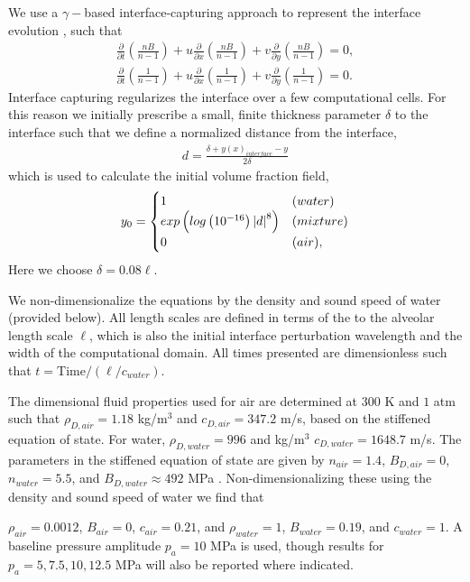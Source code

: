 \documentclass{jfm}%
\newcommand{\abs}[1]{\ensuremath{\left|#1\right|}}
\begin{document}
We use a $\gamma-$based interface-capturing approach to represent the
interface evolution \citep{Shyue1998}, such that
\begin{subequations} \label{usbe_lung_eosvar_advection}%
  \begin{align}%
    \frac{\partial}{\partial t}\left(\frac{n B}{n-1}\right)+u\frac{\partial}{\partial x}\left(\frac{n B}{n-1}\right)+v\frac{\partial}{\partial y}\left(\frac{n B}{n-1}\right) = 0,\\
    \frac{\partial}{\partial t}\left(\frac{1}{n-1}\right)+u\frac{\partial}{\partial x}\left(\frac{1}{n-1}\right)+v\frac{\partial}{\partial y}\left(\frac{1}{n-1}\right) = 0. 
  \end{align}%
\end{subequations}%
Interface capturing regularizes the interface over a few computational
cells. For this reason we initially prescribe a small, finite
thickness parameter $\delta$ to the interface \citep{Latini2007} such
that we define a normalized distance from the interface,
\begin{align*}
  d = \frac{\delta +y(x)_{interface} -y}{2\delta}
\end{align*}
which is used to calculate the initial volume fraction field,
\begin{align*}
  y_0 = %
  \begin{cases}
    1& \text(water)\\%
    exp\left(log\left(10^{-16}\right)\abs{d}^8\right)&\text(mixture)\\%
    0& \text(air),%
  \end{cases}%
\end{align*}
Here we choose $\delta=0.08\ell$.

We non-dimensionalize the equations by the density and sound speed of
water (provided below). All length scales are defined in terms of the to
the alveolar length scale $\ell$, which is also the initial interface
perturbation wavelength and the width of the computational domain. All
times presented are dimensionless such that
$t = \text{Time}/\left(\ell/c_{water}\right)$.

The dimensional fluid properties used for air are determined at $300$
K and $1$ atm such that $\rho_{D,air}=1.18$ kg/m$^3$ and
$c_{D,air}=347.2$ m/s, based on the stiffened equation of state. For
water, $\rho_{D,water}=996$ and kg/m$^3$ $c_{D,water}=1648.7$ m/s.
The parameters in the stiffened equation of state are given by
$n_{air}=1.4$, $B_{D,air} = 0$, $n_{water}=5.5$, and
$B_{D,water} \approx 492$ MPa
\citep{Marsh1980,holian1984t,Cocchi1996}. Non-dimensionalizing these
using the density and sound speed of water we find that %
\begin{comment} %
  $\rho_{air}=1$, $B_{air} = 0$, $c_{air}=1$, and
  $\rho_{water}=846.6$, $B_{water} = 3469.1$, and $c_{water}=4.75$.
\end{comment}
$\rho_{air}=0.0012$, $B_{air} = 0$, $c_{air}=0.21$, and $\rho_{water}=1$,
$B_{water} = 0.19$, and $c_{water}=1$. A baseline pressure
amplitude $p_a = 10$ MPa is used, though results for
$p_a = 5, 7.5, 10, 12.5$ MPa will also be reported where indicated.
\end{document}
